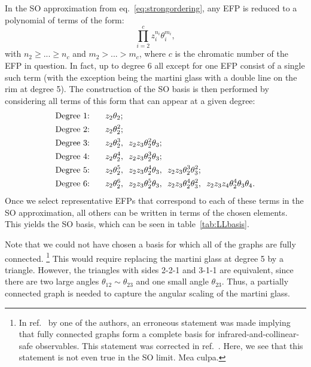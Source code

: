\documentclass[a4paper,11pt]{article}
\newcommand{\eq}[1]{eq.~\eqref{eq:#1}}
\newcommand{\tab}[1]{table~\ref{tab:#1}}
\newcommand{\nn}{\nonumber}
\newcommand{\refcite}[1]{ref.~\cite{#1}}
\begin{document}
In the SO approximation from \eq{strongordering}, any EFP is reduced to a polynomial of terms of the form:
%
\begin{equation}
    \prod^{c}_{i=2} z_i^{n_i} \theta_i^{m_i},
\end{equation}
%
with $n_2\geq ... \geq n_c$  and $m_2> ... > m_c$, where $c$ is the chromatic number of the EFP in question.
%
In fact, up to degree 6 all except for one EFP consist of a single such term (with the exception being the martini glass with a double line on the rim at degree 5).
%
The construction of the SO basis is then performed by considering all terms of this form that can appear at a given degree:
%
\begin{align}
\text{Degree 1: }\hspace{0.5cm}& z_2 \theta_2; \nn \\
\text{Degree 2: }\hspace{0.5cm}& z_2 \theta_2^2;\nn \\
\text{Degree 3: }\hspace{0.5cm}& z_2 \theta_2^3,\,\,\, z_2 z_3 \theta_2^2 \theta_3; \nn \\
\text{Degree 4: }\hspace{0.5cm}& z_2 \theta_2^4,\,\,\, z_2 z_3 \theta_2^3 \theta_3; \nn \\
\text{Degree 5: }\hspace{0.5cm}& z_2 \theta_2^5,\,\,\, z_2 z_3 \theta_2^4 \theta_3, \,\,\, z_2 z_3 \theta_2^3 \theta_3^2; \nn \\
\text{Degree 6: }\hspace{0.5cm}& z_2 \theta_2^6,\,\,\, z_2 z_3 \theta_2^5 \theta_3, \,\,\, z_2 z_3 \theta_2^4 \theta_3^2,\,\,\, z_2 z_3 z_4 \theta_2^4 \theta_3 \theta_4 . 
\end{align}
%
Once we select representative EFPs that correspond to each of these terms in the SO approximation, all others can be written in terms of the chosen elements.
%
This yields the SO basis, which can be seen in \tab{LLbasis}.


Note that we could not have chosen a basis for which all of the graphs are fully connected.%
%
\footnote{In \refcite{Moult:2016cvt} by one of the authors, an erroneous statement was made implying that fully connected graphs form a complete basis for infrared-and-collinear-safe observables.  This statement was corrected in \refcite{Komiske:2017aww}.  Here, we see that this statement is not even true in the SO limit.  Mea culpa.}
%
This would require replacing the martini glass at degree 5 by a triangle.
%
However, the triangles with sides 2-2-1 and 3-1-1 are equivalent, since there are two large angles $\theta_{12} \sim \theta_{23}$ and one small angle $\theta_{23}$.
%
Thus, a partially connected graph is needed to capture the angular scaling of the martini glass.
\end{document}
